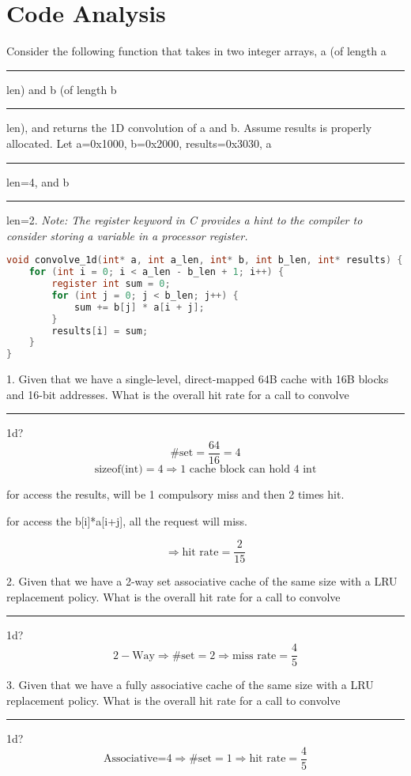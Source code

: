 \documentclass{article}
\begin{document}
\section{Code Analysis}
Consider the following function that takes in two integer arrays, a (of length a\rule{0.2cm}{0.4pt}len) and b (of length b\rule{0.2cm}{0.4pt}len), and returns the 1D convolution of a and b. Assume results is properly allocated.
Let a=0x1000, b=0x2000, results=0x3030, a\rule{0.2cm}{0.4pt}len=4, and b\rule{0.2cm}{0.4pt}len=2. \textit{Note: The register keyword in C provides a hint to the compiler to consider storing a variable in a processor register. }

\lstset{
  basicstyle=\ttfamily,
  breaklines=true,
  frame=single,
}

\begin{lstlisting}[language=C]
void convolve_1d(int* a, int a_len, int* b, int b_len, int* results) {
    for (int i = 0; i < a_len - b_len + 1; i++) {
        register int sum = 0;
        for (int j = 0; j < b_len; j++) {
            sum += b[j] * a[i + j];
        }
        results[i] = sum;
    }
}
\end{lstlisting}
1. Given that we have a single-level, direct-mapped 64B cache with 16B blocks and 16-bit addresses. What is the overall hit rate for a call to convolve\rule{0.2cm}{0.4pt}1d?\\

$$\mbox{\#set}=\frac{64}{16}=4$$
$$\mbox{sizeof(int)}=4\Rightarrow1\mbox{ cache block can hold 4 int}$$
\begin{center}
    for access the results, will be 1 compulsory miss and then 2 times hit.

    for access the b[i]*a[i+j], all the request will miss.
\end{center}
$$\Rightarrow\mbox{hit rate}=\frac{2}{15}$$

2. Given that we have a 2-way set associative cache of the same size with a LRU replacement policy. What is the overall hit rate for a call to convolve\rule{0.2cm}{0.4pt}1d?\\


$$2-\mbox{Way}\Rightarrow\mbox{\#set}=2\Rightarrow\mbox{miss rate}=\frac{4}{5}$$

3. Given that we have a fully associative cache of the same size with a LRU replacement policy. What is the overall hit rate for a call to convolve\rule{0.2cm}{0.4pt}1d?\\

$$\mbox{Associative=4}\Rightarrow\mbox{\#set}=1\Rightarrow\mbox{hit rate}=\frac{4}{5}$$
\end{document}
